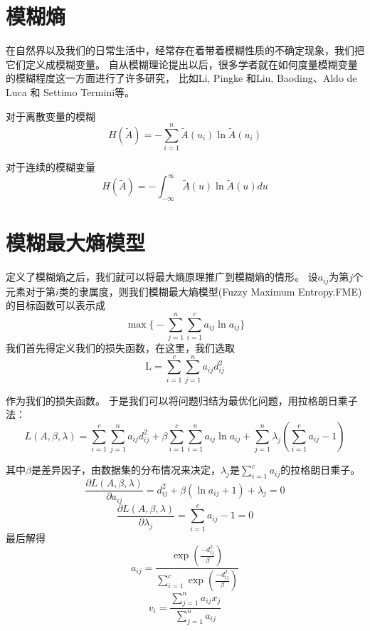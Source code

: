 \section{模糊熵}
在自然界以及我们的日常生活中，经常存在着带着模糊性质的不确定现象，我们把它们定义成模糊变量。
自从模糊理论提出以后，很多学者就在如何度量模糊变量的模糊程度这一方面进行了许多研究，
比如Li, Pingke 和Liu, Baoding\cite{li2008entropy}、Aldo de Luca 和 Settimo Termini\cite{RN3}等。
\begin{definition}[模糊熵]
    对于离散变量的模糊
    \begin{equation}
        H(\tilde{A})=-\sum_{i=1}^{n}\tilde{A}(u_i) \ln \tilde{A}(u_i)
    \end{equation}

    对于连续的模糊变量
    \begin{equation}
        H(\tilde{A})=-\int_{-\infty}^{\infty}\tilde{A}(u) \ln \tilde{A}(u) d u
    \end{equation}

\end{definition}

\newpage
\section{模糊最大熵模型}
定义了模糊熵之后，我们就可以将最大熵原理推广到模糊熵的情形。
设$a_{i j}$为第$j$个元素对于第$i$类的隶属度，则我们模糊最大熵模型(Fuzzy Maximum Entropy.FME)的目标函数可以表示成
\begin{equation}
    \max \biggl\{-\sum_{j=1}^{n} \sum_{i=1}^{c} a_{i j}\ln a_{i j}\biggr\}
    \label{MEC}
\end{equation}
我们首先得定义我们的损失函数，在这里，我们选取
\begin{equation*}
    \mathrm{L}=\sum_{i=1}^{c} \sum_{j=1}^{n}a_{i j} d_{i j}^2
\end{equation*}

作为我们的损失函数。
于是我们可以将问题归结为最优化问题，用拉格朗日乘子法：
\begin{equation}
    L(A,\beta ,\lambda)=\sum_{i=1}^{c} \sum_{j=1}^{n} a_{i j} d_{i j}^2+\beta \sum_{i=1}^{c} \sum_{i=1}^{n} a_{i j} \ln a_{i j}+\sum_{j=1}^{n} \lambda_{j}\left(\sum_{i=1}^{c} a_{i j}-1\right)
    \label{MLagrange}
\end{equation}

其中$\beta$是差异因子，由数据集的分布情况来决定，$\lambda_j$是$\sum\limits_{i=1}^{c} a_{i j}$的拉格朗日乘子。
\begin{equation}
    \frac{\partial L(A,\beta ,\lambda) }{\partial a_{i j}} =d_{i j}^2+\beta(\ln a_{i j}+1)+\lambda_j=0
\end{equation}
\begin{equation}
    \frac{\partial L(A,\beta ,\lambda)}{\partial \lambda_j}=\sum_{i=1}^{c} a_{i j}-1=0
\end{equation}
最后解得
\begin{equation}
    a_{i j}=\frac{ \exp(\frac{-d_{i j}^2}{\beta})}{\sum\limits_{i=1}^c\exp(\frac{-d_{i j}^2}{\beta})}
    \label{Maij}
\end{equation}
\begin{equation}
    v_i =\frac{\sum\limits_{j=1}^n a_{i j} x_j}{\sum\limits_{j=1}^n a_{i j}}
    \label{Mvij}
\end{equation}
